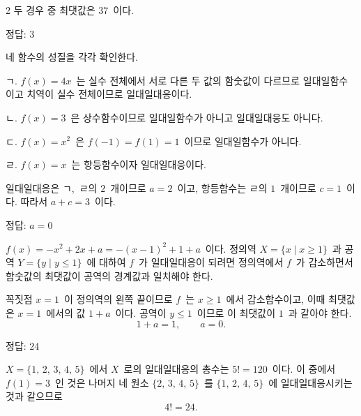 \documentclass[10pt,fleqn]{article}
\begin{document}
\begin{multicols*}{2}
\vspace{3mm}
두 경우 중 최댓값은 $37$\ 이다.

\begin{dmanswerbox}
정답: $3$
\end{dmanswerbox}

네 함수의 성질을 각각 확인한다.

\vspace{3mm}
ㄱ. $f(x) = 4x$\ 는 실수 전체에서 서로 다른 두 값의 함숫값이 다르므로 일대일함수이고 치역이 실수 전체이므로 일대일대응이다.

\vspace{3mm}
ㄴ. $f(x) = 3$\ 은 상수함수이므로 일대일함수가 아니고 일대일대응도 아니다.

\vspace{3mm}
ㄷ. $f(x) = x^{2}$\ 은 $f(-1) = f(1) = 1$\ 이므로 일대일함수가 아니다.

\vspace{3mm}
ㄹ. $f(x) = x$\ 는 항등함수이자 일대일대응이다.

\vspace{3mm}
일대일대응은 ㄱ,\ ㄹ의 $2$\ 개이므로 $a = 2$\ 이고, 항등함수는 ㄹ의 $1$\ 개이므로 $c = 1$\ 이다. 따라서 $a + c = 3$\ 이다.

\begin{dmanswerbox}
정답: $a=0$
\end{dmanswerbox}

$f(x) = -x^{2} + 2x + a = -(x - 1)^{2} + 1 + a$\ 이다. 정의역 $X = \{x \mid x \ge 1\}$\ 과 공역 $Y = \{y \mid y \le 1\}$\ 에 대하여 $f$\ 가 일대일대응이 되려면 정의역에서 $f$\ 가 감소하면서 함숫값의 최댓값이 공역의 경계값과 일치해야 한다.

꼭짓점 $x = 1$\ 이 정의역의 왼쪽 끝이므로 $f$\ 는 $x \ge 1$\ 에서 감소함수이고, 이때 최댓값은 $x = 1$\ 에서의 값 $1 + a$\ 이다. 공역이 $y \le 1$\ 이므로 이 최댓값이 $1$\ 과 같아야 한다.
\[ 1 + a = 1,\qquad a = 0. \]

\begin{dmanswerbox}
정답: $24$
\end{dmanswerbox}

$X = \{1,\, 2,\, 3,\, 4,\, 5\}$\ 에서 $X$\ 로의 일대일대응의 총수는 $5! = 120$\ 이다. 이 중에서 $f(1) = 3$\ 인 것은 나머지 네 원소 $\{2,\, 3,\, 4,\, 5\}$\ 를 $\{1,\, 2,\, 4,\, 5\}$\ 에 일대일대응시키는 것과 같으므로
\[ 4! = 24. \]


\end{multicols*}
\end{document}
